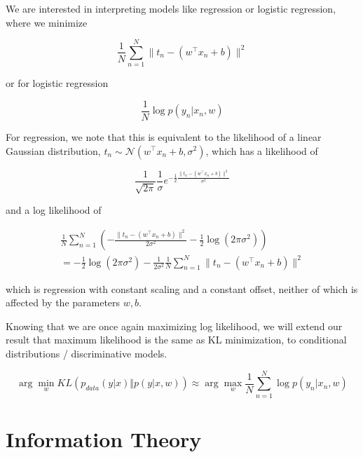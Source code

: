 \documentclass[a4paper]{article}
\begin{document}
We are interested in interpreting models like regression or logistic regression, where we minimize

\begin{equation}
  \frac{1}{N} \sum_{n=1}^N \lVert t_n - ( w^\intercal x_n + b) \rVert^2
  \label{}
\end{equation}

or for logistic regression

\begin{equation}
  \frac{1}{N} \log p(y_n \vert x_n, w)
  \label{}
\end{equation}

For regression, we note that this is equivalent to the likelihood of a linear Gaussian distribution, $ t_n \sim \mathcal{N} \left( w^\intercal x_n + b, \sigma^2 \right)$, which has a likelihood of

\begin{equation}
  \frac{1}{\sqrt{ 2 \pi} } \frac{1}{\sigma} e^{ - \frac{1}{2} \frac{\lVert t_n - \left( w^\intercal x_n + b \right) \rVert^2 }{ \sigma^2} }
  \label{}
\end{equation}

and a log likelihood of

\begin{equation}
  \begin{split}
    \frac{1}{N} \sum_{n=1}^N \left( - \frac{\lVert t_n - \left( w^\intercal x_n + b \right)\rVert^2}{2 \sigma^2} - \frac{1}{2} \log ( 2 \pi \sigma^2) \right) \\
    = - \frac{1}{2} \log ( 2 \pi \sigma^2 ) - \frac{1}{2 \sigma^2} \frac{1}{N} \sum_{n=1}^N \lVert t_n - \left( w^\intercal x_n + b \right) \rVert^2
  \end{split}
  \label{regression}
\end{equation}

which is regression with constant scaling and a constant offset, neither of which is affected by the parameters $w,b$.

Knowing that we are once again maximizing log likelihood, we will extend our result that maximum likelihood is the same as KL minimization, to conditional distributions / discriminative models.

\begin{equation}
  \arg \min_w KL\left( p_{data}(y \vert x) \Vert p( y \vert x, w) \right) \approx \arg \max_w \frac{1}{N} \sum_{n=1}^N \log p(y_n \vert x_n, w)
  \label{}
\end{equation}

\section{Information Theory}
\end{document}
